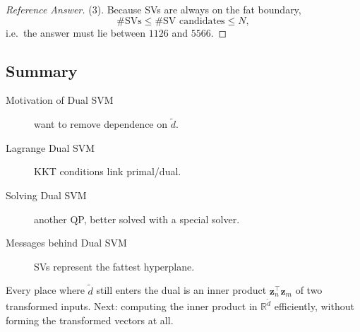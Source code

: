 \begin{proof}[Reference Answer]
    (3). Because SVs are always on the fat boundary,
    \[
        \#\text{SVs} \le \#\text{SV candidates} \le N,
    \]
    i.e.\ the answer must lie between \(1126\) and \(5566\).
\end{proof}

\hrulebar

\subsection*{Summary}

\begin{description}
    \item[Motivation of Dual SVM] want to remove dependence on
        \(\tilde{d}\).
    \item[Lagrange Dual SVM] KKT conditions link primal/dual.
    \item[Solving Dual SVM] another QP, better solved with a special
        solver.
    \item[Messages behind Dual SVM] SVs represent the fattest hyperplane.
\end{description}

Every place where \(\tilde{d}\) still enters the dual is an inner product
\(\bm{z}_n^\top \bm{z}_m\) of two transformed inputs. Next: computing the
inner product in \(\mathbb{R}^{\tilde{d}}\) efficiently, without forming the
transformed vectors at all.
